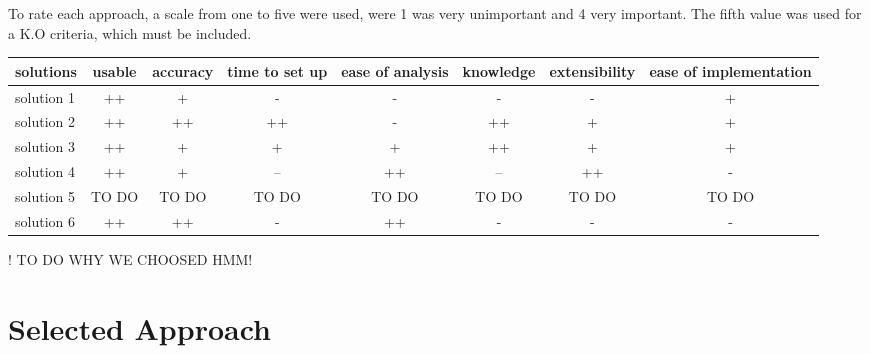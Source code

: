 To rate each approach, a scale from one to five were used, were 1 was very unimportant and 4 very important. The fifth value was used for a K.O criteria, which must be included.

\begin{table}[h]
\begin{tabular}{|l|c|c|c|c|c|c|c|}
\hline
\textbf{solutions} & usable & accuracy & time to set up & ease of analysis & knowledge & extensibility & ease of implementation \\
\hline
solution 1 &\cellcolor[HTML]{38761d}++&\cellcolor[HTML]{93c47d}+&\cellcolor[HTML]{dd7e6b}-&\cellcolor[HTML]{dd7e6b}-&\cellcolor[HTML]{dd7e6b}-&\cellcolor[HTML]{dd7e6b}-&\cellcolor[HTML]{93c47d}+ \\
\hline
solution 2 &\cellcolor[HTML]{38761d}++&\cellcolor[HTML]{38761d}++&\cellcolor[HTML]{38761d}++&\cellcolor[HTML]{dd7e6b}-&\cellcolor[HTML]{38761d}++&\cellcolor[HTML]{93c47d}+&\cellcolor[HTML]{93c47d}+\\
\hline
solution 3 &\cellcolor[HTML]{38761d}++&\cellcolor[HTML]{93c47d}+&\cellcolor[HTML]{93c47d}+&\cellcolor[HTML]{93c47d}+&\cellcolor[HTML]{38761d}++&\cellcolor[HTML]{93c47d}+&\cellcolor[HTML]{93c47d}+\\
\hline
solution 4 &\cellcolor[HTML]{38761d}++&\cellcolor[HTML]{93c47d}+&\cellcolor[HTML]{cc4125}--&\cellcolor[HTML]{38761d}++&\cellcolor[HTML]{cc4125}--&\cellcolor[HTML]{38761d}++&\cellcolor[HTML]{dd7e6b}-\\
\hline
solution 5 &TO DO & TO DO & TO DO & TO DO & TO DO & TO DO & TO DO \\
\hline
solution 6 &\cellcolor[HTML]{38761d}++&\cellcolor[HTML]{38761d}++&\cellcolor[HTML]{dd7e6b}-&\cellcolor[HTML]{38761d}++&\cellcolor[HTML]{dd7e6b}-&\cellcolor[HTML]{dd7e6b}-&\cellcolor[HTML]{dd7e6b}-\\
\hline
\end{tabular}
\end{table}

! TO DO WHY WE CHOOSED HMM!

\section{Selected Approach}




